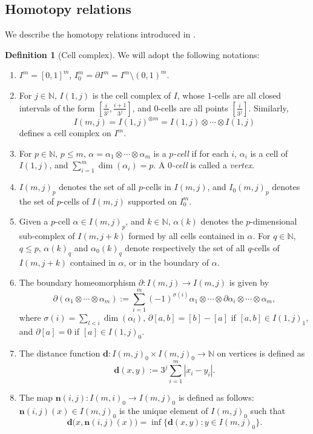 \documentclass[10pt]{amsart}
\theoremstyle{definition}
\newtheorem{definition}[theorem]{Definition}
\theoremstyle{remark}
\numberwithin{equation}{section}
\newcommand{\al}{\alpha}
\newcommand{\N}{\mathbb{N}}
\newcommand{\si}{\sigma}
\newcommand{\n}{\mathbf{n}}
\newcommand{\md}{\mathbf{d}}
\begin{document}
\subsection{Homotopy relations}
\label{SS:homotopy}


We describe the homotopy relations introduced in \cite[\S 4.1]{Pitts}. 

\begin{definition}[Cell complex]
\label{D:cell}
We will adopt the following notations:
\begin{enumerate}
\item $I^m=[0, 1]^m$, $I^m_0=\partial I^m=I^m \setminus (0, 1)^m$.
\item For $j\in\N$, $I(1, j)$ is the cell complex of $I$, whose $1$-cells are all closed intervals of the form $[\frac{i}{3^{j}}, \frac{i+1}{3^{j}}]$, and $0$-cells are all points $[\frac{i}{3^{j}}]$. Similarly, 
\[ I(m, j)=I(1,j)^{\otimes m}=I(1, j)\otimes \cdots \otimes I(1, j)\]
defines a cell complex on $I^m$.
\item For $p\in\N$, $p\leq m$, $\al=\al_1\otimes\cdots\otimes\al_m$ is a \emph{$p$-cell} if for each $i$, $\al_i$ is a cell of $I(1, j)$, and $\sum_{i=1}^m \dim(\al_i)=p$. A \emph{$0$-cell} is called a \emph{vertex}.
\item $I(m, j)_p$ denotes the set of all $p$-cells in $I(m, j)$, and $I_0(m, j)_p$ denotes the set of $p$-cells of $I(m, j)$ supported on $I^m_0$.
\item Given a $p$-cell $\al\in I(m, j)_p$, and $k\in\N$, $\al(k)$ denotes the $p$-dimensional sub-complex of $I(m, j+k)$ formed by all cells contained in $\al$. For $q\in\N$, $q\leq p$, $\al(k)_q$ and $\al_0(k)_q$ denote respectively the set of all $q$-cells of $I(m, j+k)$ contained in $\al$, or in the boundary of $\al$.
\item The boundary homeomorphism $\partial: I(m, j)\rightarrow I(m, j)$ is given by
$$\partial(\al_1\otimes\cdots\otimes\al_m):=\sum_{i=1}^m(-1)^{\si(i)}\al_1\otimes\cdots\otimes \partial \al_i\otimes\cdots\otimes\al_m,$$
where $\si(i)=\sum_{l<i}\dim(\al_l)$, $\partial[a, b]=[b]-[a]$ if $[a, b]\in I(1, j)_1$, and $\partial[a]=0$ if $[a]\in I(1, j)_0$.
\item The distance function $\md: I(m, j)_0\times I(m, j)_0\rightarrow\N$ on vertices is defined as
$$\md(x, y):=3^{j}\sum_{i=1}^m|x_i-y_i|.$$
\item The map $\n(i, j): I(m, i)_{0}\rightarrow I(m, j)_{0}$ is defined as follows: $\n(i, j)(x)\in I(m, j)_{0}$ is the unique element of $I(m, j)_0$ such that 
$$\md\big(x, \n(i, j)(x)\big)=\inf\big\{\md(x, y): y\in I(m, j)_{0}\big\}.$$
\end{enumerate}
\end{definition}
\end{document}
